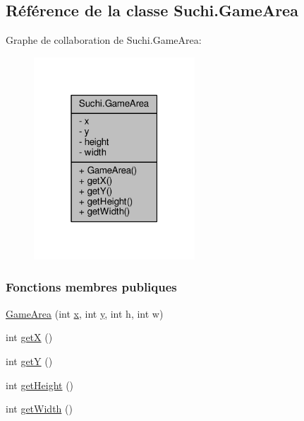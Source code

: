 \hypertarget{classSuchi_1_1GameArea}{}\subsection{Référence de la classe Suchi.\+Game\+Area}
\label{classSuchi_1_1GameArea}


Graphe de collaboration de Suchi.\+Game\+Area\+:\nopagebreak
\begin{figure}[H]
\begin{center}
\leavevmode
\includegraphics[width=171pt]{classSuchi_1_1GameArea__coll__graph}
\end{center}
\end{figure}
\subsubsection*{Fonctions membres publiques}
\begin{DoxyCompactItemize}
\item 
\hyperlink{classSuchi_1_1GameArea_a61c76bafee149d83259aea88df0c804e}{Game\+Area} (int \hyperlink{classSuchi_1_1GameArea_aa89bcaf59584201e5cdbf3006e33880b}{x}, int \hyperlink{classSuchi_1_1GameArea_a21715e2b105c4d602b0eabfa550d6e3a}{y}, int h, int w)
\item 
int \hyperlink{classSuchi_1_1GameArea_a598bf061ee493a40893f183fcbfc4be8}{get\+X} ()
\item 
int \hyperlink{classSuchi_1_1GameArea_adf21d825c56540c007bc97e7e484f41f}{get\+Y} ()
\item 
int \hyperlink{classSuchi_1_1GameArea_a9132a916eaeedc3e94c6365869833bde}{get\+Height} ()
\item 
int \hyperlink{classSuchi_1_1GameArea_aa821a0904266c1595e4f503995b7f8ac}{get\+Width} ()
\end{DoxyCompactItemize}
